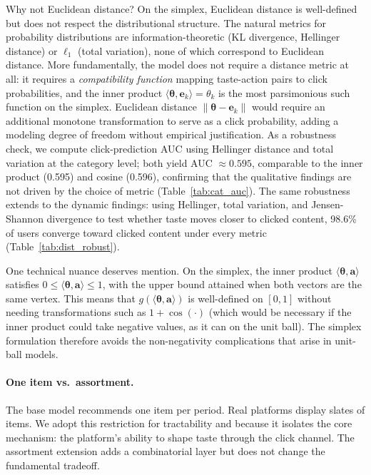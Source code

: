 \documentclass[11pt]{article}
\begin{document}
Why not Euclidean distance? On the simplex, Euclidean distance is well-defined but does not respect the distributional structure. The natural metrics for probability distributions are information-theoretic (KL divergence, Hellinger distance) or $\ell_1$ (total variation), none of which correspond to Euclidean distance. More fundamentally, the model does not require a distance metric at all: it requires a \emph{compatibility function} mapping taste-action pairs to click probabilities, and the inner product $\langle \boldsymbol{\theta}, \mathbf{e}_k \rangle = \theta_k$ is the most parsimonious such function on the simplex. Euclidean distance $\|\boldsymbol{\theta} - \mathbf{e}_k\|$ would require an additional monotone transformation to serve as a click probability, adding a modeling degree of freedom without empirical justification. As a robustness check, we compute click-prediction AUC using Hellinger distance and total variation at the category level; both yield AUC $\approx 0.595$, comparable to the inner product (0.595) and cosine (0.596), confirming that the qualitative findings are not driven by the choice of metric (Table~\ref{tab:cat_auc}). The same robustness extends to the dynamic findings: using Hellinger, total variation, and Jensen-Shannon divergence to test whether taste moves closer to clicked content, 98.6\% of users converge toward clicked content under every metric (Table~\ref{tab:dist_robust}).

One technical nuance deserves mention. On the simplex, the inner product $\langle \boldsymbol{\theta}, \mathbf{a} \rangle$ satisfies $0 \le \langle \boldsymbol{\theta}, \mathbf{a} \rangle \le 1$, with the upper bound attained when both vectors are the same vertex. This means that $g(\langle \boldsymbol{\theta}, \mathbf{a} \rangle)$ is well-defined on $[0,1]$ without needing transformations such as $1 + \cos(\cdot)$ (which would be necessary if the inner product could take negative values, as it can on the unit ball). The simplex formulation therefore avoids the non-negativity complications that arise in unit-ball models.

\paragraph{One item vs.\ assortment.} The base model recommends one item per period. Real platforms display slates of items. We adopt this restriction for tractability and because it isolates the core mechanism: the platform's ability to shape taste through the click channel. The assortment extension adds a combinatorial layer but does not change the fundamental tradeoff.
\end{document}
